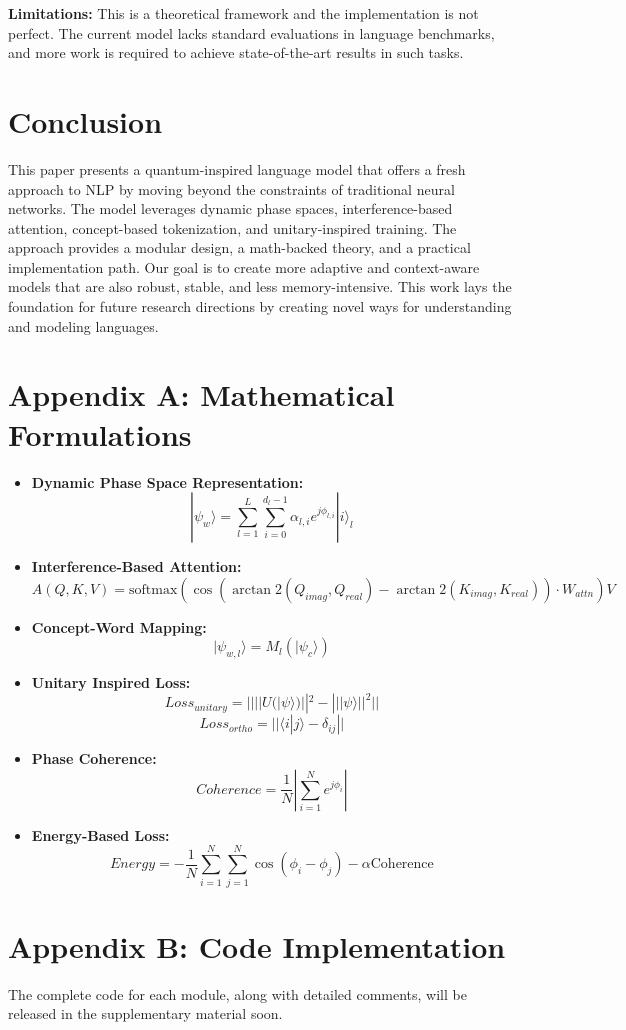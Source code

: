 \documentclass[11pt, a4paper]{article}
\begin{document}
\textbf{Limitations:} This is a theoretical framework and the implementation is not perfect. The current model lacks standard evaluations in language benchmarks, and more work is required to achieve state-of-the-art results in such tasks.

\section{Conclusion}

This paper presents a quantum-inspired language model that offers a fresh approach to NLP by moving beyond the constraints of traditional neural networks. The model leverages dynamic phase spaces, interference-based attention, concept-based tokenization, and unitary-inspired training. The approach provides a modular design, a math-backed theory, and a practical implementation path. Our goal is to create more adaptive and context-aware models that are also robust, stable, and less memory-intensive. This work lays the foundation for future research directions by creating novel ways for understanding and modeling languages.

\section*{Appendix A: Mathematical Formulations}

\begin{itemize}
    \item \textbf{Dynamic Phase Space Representation:}
        $$
        |\psi_w\rangle = \sum_{l=1}^{L} \sum_{i=0}^{d_l-1} \alpha_{l,i} e^{j\phi_{l,i}} |i\rangle_l
        $$
    \item \textbf{Interference-Based Attention:}
        $$
        A(Q,K,V) = \text{softmax}( \cos(\arctan2(Q_{imag}, Q_{real}) - \arctan2(K_{imag}, K_{real})) \cdot W_{attn})V
        $$
    \item \textbf{Concept-Word Mapping:}
        $$
        |\psi_{w,l}\rangle = M_l(|\psi_c\rangle)
        $$
    \item \textbf{Unitary Inspired Loss:}
        $$
        Loss_{unitary} = || ||U( |\psi\rangle) ||^2 - || |\psi\rangle ||^2 ||
        $$
        $$
         Loss_{ortho} = ||\langle i| j \rangle - \delta_{ij} ||
        $$
    \item \textbf{Phase Coherence:}
        $$
        Coherence = \frac{1}{N} |\sum_{i=1}^{N} e^{j \phi_i} |
        $$
    \item \textbf{Energy-Based Loss:}
        $$
        Energy = -\frac{1}{N} \sum_{i=1}^{N} \sum_{j=1}^{N} \cos(\phi_i - \phi_j) - \alpha \text{Coherence}
        $$
\end{itemize}

\section*{Appendix B: Code Implementation}
The complete code for each module, along with detailed comments, will be released in the supplementary material soon.
\end{document}
